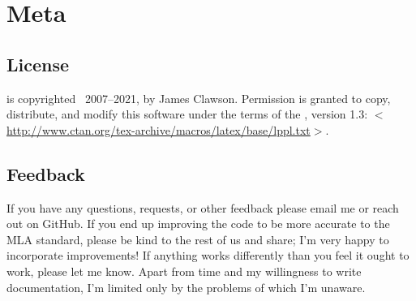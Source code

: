\documentclass{ltxdockit}
\newcommand*{\biblatexmla}{\sty{biblatex-mla}\xspace}
\newcommand*{\mylink}[1]{$<$\url{#1}$>$}
\newcommand*{\mla}{MLA\xspace}
\begin{document}

\section{Meta}
\subsection{License}

\biblatexmla is copyrighted \textcopyright\ 2007--2021, by James Clawson. Permission is granted to copy, distribute, and modify this software under the terms of the \lppl, version 1.3: \mylink{http://www.ctan.org/tex-archive/macros/latex/base/lppl.txt}.

\subsection[Feedback]{Feedback}
\label{int:feb}

If you have any questions, requests, or other feedback please email me or reach out on GitHub. If you end up improving the code to be more accurate to the \mla{} standard, please be kind to the rest of us and share; I'm very happy to incorporate improvements! If anything works differently than you feel it ought to work, please let me know. Apart from time and my willingness to write documentation, I'm limited only by the problems of which I'm unaware.
\end{document}
